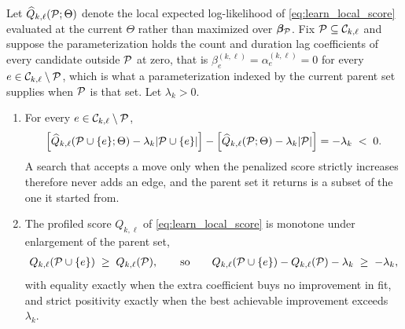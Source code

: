\begin{proposition}
\label{prop:learn_profiling}
Let $\widehat{Q}_{k,\ell}({\mathcal{P}};\Theta)$ denote the local expected log-likelihood of
\cref{eq:learn_local_score} evaluated at the current $\Theta$ rather than maximized over
${\boldsymbol{\beta}}_{\mathcal{P}}$. Fix ${\mathcal{P}} \subseteq {\mathcal{C}}_{k,\ell}$ and suppose the parameterization holds the count and
duration lag coefficients of every candidate outside ${\mathcal{P}}$ at zero, that is
$\beta_e^{(k,\ell)} = \alpha_e^{(k,\ell)} = 0$ for every $e \in {\mathcal{C}}_{k,\ell} \setminus {\mathcal{P}}$, which
is what a parameterization indexed by the current parent set supplies when ${\mathcal{P}}$ is that set. Let
$\lambda_k > 0$.
\begin{enumerate}
\item For every $e \in {\mathcal{C}}_{k,\ell} \setminus {\mathcal{P}}$,
\begin{align}
\Big[\widehat{Q}_{k,\ell}({\mathcal{P}} \cup \{e\};\Theta) - \lambda_k|{\mathcal{P}} \cup \{e\}|\Big]
-
\Big[\widehat{Q}_{k,\ell}({\mathcal{P}};\Theta) - \lambda_k|{\mathcal{P}}|\Big]
=
-\lambda_k \;<\; 0 .
\label{eq:learn_addition_is_minus_lambda}
\end{align}
A search that accepts a move only when the penalized score strictly increases therefore never
adds an edge, and the parent set it returns is a subset of the one it started from.
\item The profiled score $Q_{k,\ell}$ of \cref{eq:learn_local_score} is monotone under enlargement
of the parent set,
\begin{align}
Q_{k,\ell}({\mathcal{P}} \cup \{e\}) \;\ge\; Q_{k,\ell}({\mathcal{P}}),
\qquad\text{so}\qquad
Q_{k,\ell}({\mathcal{P}} \cup \{e\}) - Q_{k,\ell}({\mathcal{P}}) - \lambda_k \;\ge\; -\lambda_k ,
\label{eq:learn_profiled_gain}
\end{align}
with equality exactly when the extra coefficient buys no improvement in fit, and strict positivity
exactly when the best achievable improvement exceeds $\lambda_k$.
\end{enumerate}
\end{proposition}

